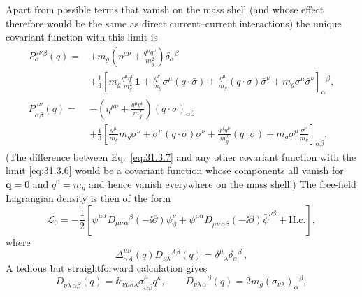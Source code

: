 Apart from possible terms that vanish on the mass shell (and whose effect
therefore would be the same as direct current--current interactions) the
unique covariant function with this limit is
\begin{equation}
  \begin{aligned}
  P^{\mu\nu}_{\alpha}{}^\beta(q)
  ={}&+m_g\left(\eta^{\mu\nu}
       +\frac{q^\mu q^\nu}{m_g^2}\right)\delta_\alpha{}^\beta\\
  &+\frac13\left[
    m_g\frac{q^\mu q^\nu}{m_g^2}\mathbf{1}
    +\frac{q^\nu}{m_g}\sigma^\mu(q\cdot\bar\sigma)
    +\frac{q^\mu}{m_g}(q\cdot\sigma)\bar\sigma^\nu
    +m_g\sigma^\mu\bar\sigma^\nu
  \right]_\alpha{}^\beta ,
  \\
  P^{\mu\nu}_{\alpha\dot\beta}(q)
  ={}&-\left(\eta^{\mu\nu}
       +\frac{q^\mu q^\nu}{m_g^2}\right)
       (q\cdot\sigma)_{\alpha\dot\beta}\\
  &+\frac13\left[
    \frac{q^\mu}{m_g}m_g\sigma^\nu
    +\sigma^\mu(q\cdot\bar\sigma)\sigma^\nu
    +\frac{q^\mu q^\nu}{m_g^2}(q\cdot\sigma)
    +m_g\sigma^\mu\frac{q^\nu}{m_g}
  \right]_{\alpha\dot\beta}.
  \end{aligned}
  \tag{31.3.7}\label{eq:31.3.7}
\end{equation}
(The difference between Eq.~\eqref{eq:31.3.7} and any other covariant
function with the limit \eqref{eq:31.3.6} would be a covariant function
whose components all vanish for \(\boldsymbol q=0\) and \(q^0=m_g\) and
hence vanish everywhere on the mass shell.) The free-field Lagrangian
density is then of the form
\begin{equation}
  \mathcal L_0
  =-\frac12\left[
    \psi^{\mu\alpha}D_{\mu\nu\,\alpha}{}^\beta
      (-\ii\partial)\psi^\nu_\beta
    +\psi^{\mu\alpha}D_{\mu\nu\,\alpha\dot\beta}
      (-\ii\partial)\bar\psi^{\nu\dot\beta}
    +\mathrm{H.c.}\right],
  \tag{31.3.8}\label{eq:31.3.8}
\end{equation}
where
\begin{equation}
  \Delta^{\mu\nu}_{\alpha A}(q)
  D_{\nu\lambda}{}^{A\beta}(q)
  =\delta^\mu{}_\lambda\delta_\alpha{}^\beta\,,
  \tag{31.3.9}\label{eq:31.3.9}
\end{equation}
A tedious but straightforward calculation gives
\begin{equation}
  D_{\nu\lambda\,\alpha\dot\beta}(q)
  =\ii\epsilon_{\nu\mu\kappa\lambda}
    \sigma^\mu_{\alpha\dot\beta}q^\kappa,
  \qquad
  D_{\nu\lambda\,\alpha}{}^\beta(q)
  =2m_g(\sigma_{\nu\lambda})_\alpha{}^\beta,
  \tag{31.3.10}\label{eq:31.3.10}
\end{equation}
